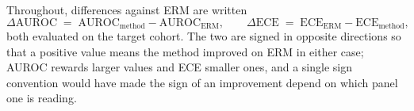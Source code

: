 %
%

Throughout, differences against ERM are written
\[
  \Delta\mathrm{AUROC} \;=\; \mathrm{AUROC}_{\text{method}} - \mathrm{AUROC}_{\text{ERM}},
  \qquad
  \Delta\mathrm{ECE} \;=\; \mathrm{ECE}_{\text{ERM}} - \mathrm{ECE}_{\text{method}},
\]
both evaluated on the target cohort. The two are signed in opposite
directions so that a positive value means the method improved on ERM in
either case; AUROC rewards larger values and ECE smaller ones, and a
single sign convention would have made the sign of an improvement depend
on which panel one is reading.


